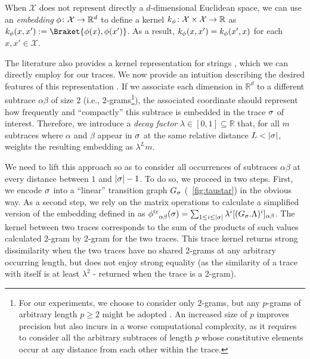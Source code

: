 When $\mathcal{X}$ does not represent directly a $d$-dimensional Euclidean space, we can use an \emph{embedding} $\phi\colon\mathcal{X}\to \mathbb{R}^d$ to define a kernel $k_\phi\colon \mathcal{X}\times \mathcal{X}\to\mathbb{R}$ as $k_\embed(x,x'):=\Braket{\embed(x),\embed(x')}$. As a result, $k_\phi(x,x')=k_\phi(x',x)$ for each $x,x'\in\mathcal{X}$.

The literature also provides a kernel representation for strings \cite{LodhiSSCW02,GartnerFW03}, which we can directly employ for our traces. We now provide an intuition describing the desired features of this representation \cite{LodhiSSCW02}. If we associate each dimension in $\mathbb{R}^d$ to a different subtrace $\alpha\beta$ of size $2$ (i.e., $2$-grams\footnote{\label{fn:caveat}For our experiments, we choose to consider only $2$-grams, but any $p$-grams of arbitrary length $p\geq 2$ might be adopted \cite{Gartner03}. An increased size of $p$ improves precision but also incurs in a worse computational complexity, as it requires to consider all the arbitrary subtraces of length $p$ whose constitutive elements occur at any distance from each other within the trace.}), the associated coordinate should represent how frequently and ``compactly'' this subtrace is embedded in the trace $\sigma$ of interest. Therefore, we introduce a \emph{decay factor} $\lambda\in[0,1]\subseteq\mathbb{R}$ that, for all $m$ subtraces where $\alpha$ and $\beta$ appear in $\sigma$ at the same relative distance $L < |\sigma|$, weights the resulting embedding as $\lambda^Lm$.

We need to lift this approach so as to consider all occurrences of subtraces $\alpha\beta$ at every distance between $1$ and $|\sigma|-1$. To do so, we proceed in two steps. First, we encode $\sigma$ into a ``linear'' transition graph $G_\sigma$ (\figurename~\ref{fig:taustar}) in the obvious way. %
As a second step, we rely on the matrix operations to calculate a simplified version of the embedding defined in \cite{LodhiSSCW02} as ${\phi^{\text{tr}}}_{\alpha\beta}(\sigma)=\sum_{1\leq i\leq |\sigma|}\lambda^i[(G_{\sigma}.\Lambda)^i]_{\alpha\beta}$. %
The kernel between two traces corresponds to the sum of the products of such values calculated 2-gram by 2-gram for the two traces.
This trace kernel returns strong dissimilarity when the two traces have no shared 2-grams at any arbitrary occurring length, but does not enjoy strong equality (as the similarity of a trace with itself is at least $\lambda^2$ - returned when the trace is a 2-gram).

